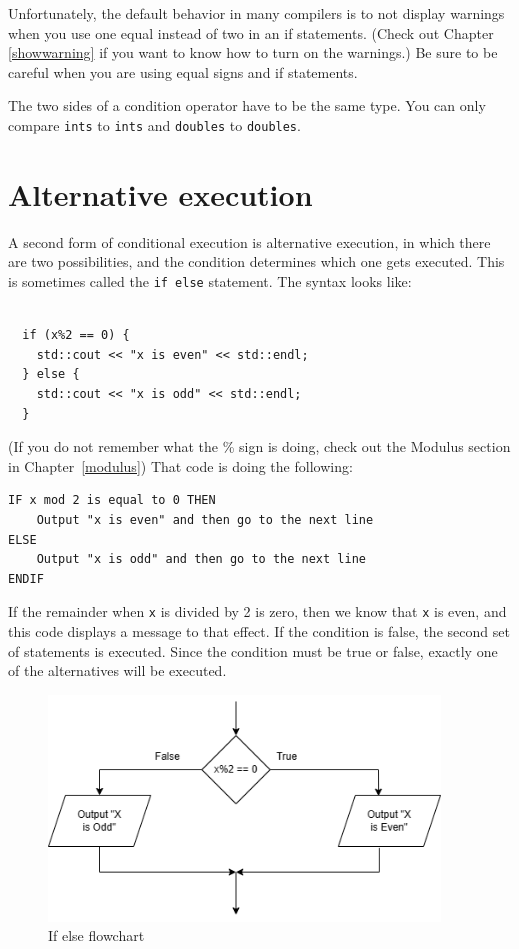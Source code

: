 Unfortunately, the default behavior in many compilers is to not display warnings when you use one equal instead of two in an if statements. (Check out Chapter \ref{showwarning} if you want to know how to turn on the warnings.) Be sure to be careful when you are using equal signs and if statements.

The two sides of a condition operator have to be the same
type.  You can only compare {\tt ints} to {\tt ints} and
{\tt doubles} to {\tt doubles}. 

\section {Alternative execution}
\label{alternative}

A second form of conditional execution is alternative execution,
in which there are two possibilities, and the condition determines
which one gets executed.  This is sometimes called the {\tt if else} statement. The syntax looks like:

\begin{lstlisting}
    
  if (x%2 == 0) {
    std::cout << "x is even" << std::endl;
  } else {
    std::cout << "x is odd" << std::endl;
  }
\end{lstlisting}
%
(If you do not remember what the \% sign is doing, check out the
Modulus section in Chapter~\ref{modulus})
That code is doing the following:
\begin{verbatim}
IF x mod 2 is equal to 0 THEN
    Output "x is even" and then go to the next line
ELSE
    Output "x is odd" and then go to the next line
ENDIF
\end{verbatim}
If the remainder when {\tt x} is divided by 2 is zero, then
we know that {\tt x} is even, and this code displays a message
to that effect.  If the condition is false, the second
set of statements is executed.  Since the condition must
be true or false, exactly one of the alternatives will be
executed.

\begin{figure}[h]
    \centering
    \includegraphics[height=6cm]{images/ifelseflow.png}
    \caption{If else flowchart}
    \label{fig:ifelseflow}
\end{figure}


